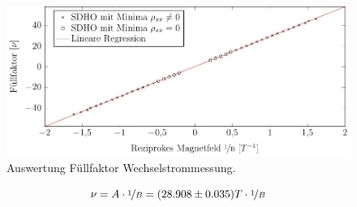 \begin{figure}[h]
	\centering
	\includegraphics{graphs/ac/auswertung.pdf}
	\caption[Auswertung Füllfaktor Wechselstrommessung]{
		Auswertung Füllfaktor Wechselstrommessung.
	}
	\label{fig:ac_ausw}
\end{figure}

\begin{equation}
\nu= A\cdot \nicefrac{1}{B}=(28.908\pm 0.035)T \cdot \nicefrac{1}{B}
\end{equation}